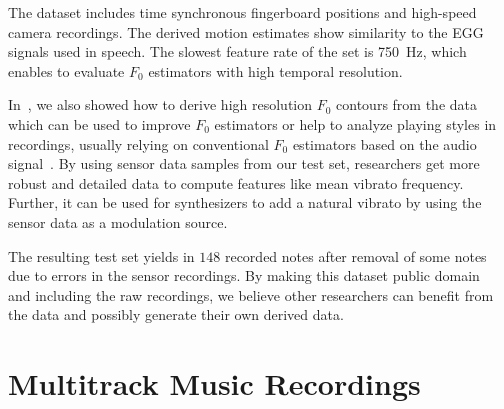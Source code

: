 \par
The dataset includes time synchronous fingerboard positions and high-speed camera recordings. 
The derived motion estimates show similarity to the EGG signals used in speech. 
The slowest feature rate of the set is \SI{750}{\hertz}, which enables to evaluate $F_0$ estimators with high temporal resolution. 
\par
In~\cite{stoeter15acm}, we also showed how to derive high resolution $F_0$ contours from the data which can be used to improve $F_0$ estimators or help to analyze playing styles in recordings, usually relying on conventional $F_0$ estimators based on the audio signal~\cite{mellody2000time}. 
By using sensor data samples from our test set, researchers get more robust and detailed data to compute features like mean vibrato frequency. 
Further, it can be used for synthesizers to add a natural vibrato by using the sensor data as a modulation source.
\par
The resulting test set yields in $148$ recorded notes after removal of some notes due to errors in the sensor recordings.
By making this dataset public domain~\cite{oss_muserc} and including the raw recordings, we believe other researchers can benefit from the data and possibly generate their own derived data.

\section{Multitrack Music Recordings}%
\label{sec:multitrack}

